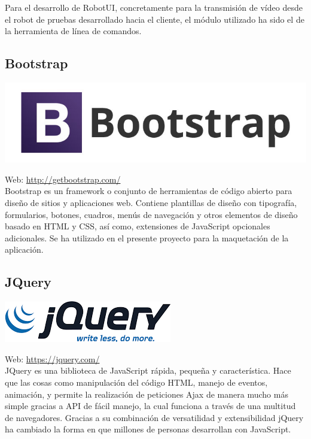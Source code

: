 Para el desarrollo de RobotUI, concretamente para la transmisión de vídeo desde el robot de pruebas desarrollado hacia el cliente, el módulo utilizado ha sido el de la herramienta de línea de comandos.


\subsection{Bootstrap}


\begin{center}
\includegraphics[scale=0.3]{imagenes/bootstrap-logo.jpg}
\end{center}

Web: \url{http://getbootstrap.com/}\\

Bootstrap es un framework o conjunto de herramientas de código abierto para diseño de sitios y aplicaciones web. Contiene plantillas de diseño con tipografía, formularios, botones, cuadros, menús de navegación y otros elementos de diseño basado en HTML y CSS, así como, extensiones de JavaScript opcionales adicionales. Se ha utilizado en el presente proyecto para la maquetación de la aplicación.

\subsection{JQuery}


\begin{center}
\includegraphics[scale=0.7]{imagenes/jquery-logo.png}
\end{center}

Web: \url{https://jquery.com/}\\

JQuery es una biblioteca de JavaScript rápida, pequeña y característica. Hace que las cosas como manipulación del código HTML, manejo de eventos, animación, y permite la realización de 
peticiones Ajax de manera mucho más simple gracias a API de fácil manejo, la cual funciona a través de una multitud de navegadores. Gracias a su combinación de versatilidad y extensibilidad jQuery
ha cambiado la forma en que millones de personas desarrollan con JavaScript.\\


